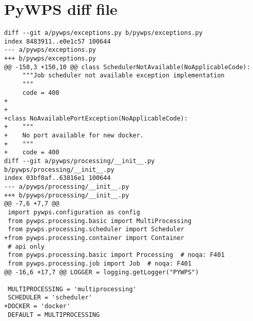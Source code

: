 \newpage
\section{PyWPS diff file}
\label{app:pywps}
\begin{lstlisting}[basicstyle=\small,caption={pywps diff file}]
diff --git a/pywps/exceptions.py b/pywps/exceptions.py
index 8483911..e0e1c57 100644
--- a/pywps/exceptions.py
+++ b/pywps/exceptions.py
@@ -150,3 +150,10 @@ class SchedulerNotAvailable(NoApplicableCode):
     """Job scheduler not available exception implementation
     """
     code = 400
+
+
+class NoAvailablePortException(NoApplicableCode):
+    """
+    No port available for new docker.
+    """
+    code = 400
diff --git a/pywps/processing/__init__.py b/pywps/processing/__init__.py
index 03bf0af..63816e1 100644
--- a/pywps/processing/__init__.py
+++ b/pywps/processing/__init__.py
@@ -7,6 +7,7 @@
 import pywps.configuration as config
 from pywps.processing.basic import MultiProcessing
 from pywps.processing.scheduler import Scheduler
+from pywps.processing.container import Container
 # api only
 from pywps.processing.basic import Processing  # noqa: F401
 from pywps.processing.job import Job  # noqa: F401
@@ -16,6 +17,7 @@ LOGGER = logging.getLogger("PYWPS")
 
 MULTIPROCESSING = 'multiprocessing'
 SCHEDULER = 'scheduler'
+DOCKER = 'docker'
 DEFAULT = MULTIPROCESSING
 

\end{lstlisting}
